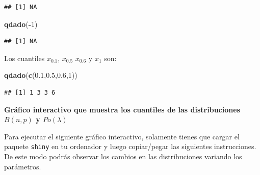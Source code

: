 \documentclass[]{book}
\newenvironment{Shaded}{\begin{snugshade}}{\end{snugshade}}
\newcommand{\DecValTok}[1]{\textcolor[rgb]{0.00,0.00,0.81}{#1}}
\newcommand{\FloatTok}[1]{\textcolor[rgb]{0.00,0.00,0.81}{#1}}
\newcommand{\KeywordTok}[1]{\textcolor[rgb]{0.13,0.29,0.53}{\textbf{#1}}}
\newcommand{\NormalTok}[1]{#1}
\newcommand{\OperatorTok}[1]{\textcolor[rgb]{0.81,0.36,0.00}{\textbf{#1}}}
\begin{document}
\begin{verbatim}
## [1] NA
\end{verbatim}

\begin{Shaded}
\begin{Highlighting}[]
\KeywordTok{qdado}\NormalTok{(}\OperatorTok{-}\DecValTok{1}\NormalTok{)}
\end{Highlighting}
\end{Shaded}

\begin{verbatim}
## [1] NA
\end{verbatim}

Los cuantiles \(x_{0.1}\), \(x_{0.5}\) \(x_{0.6}\) y \(x_1\) son:

\begin{Shaded}
\begin{Highlighting}[]
\KeywordTok{qdado}\NormalTok{(}\KeywordTok{c}\NormalTok{(}\FloatTok{0.1}\NormalTok{,}\FloatTok{0.5}\NormalTok{,}\FloatTok{0.6}\NormalTok{,}\DecValTok{1}\NormalTok{))}
\end{Highlighting}
\end{Shaded}

\begin{verbatim}
## [1] 1 3 3 6
\end{verbatim}

\textbf{Gráfico interactivo que muestra los cuantiles de las distribuciones \(B(n,p)\) y \(Po(\lambda)\)}

Para ejecutar el siguiente gráfico interactivo, solamente tienes que cargar el paquete \texttt{shiny} en tu ordenador y luego copiar/pegar las siguientes instrucciones. De este modo podrás observar los cambios en las distribuciones variando los parámetros.
\end{document}
